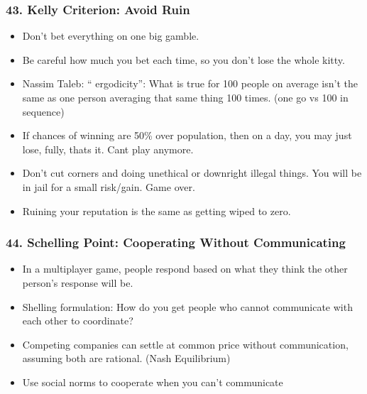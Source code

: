 \begin{frame}[fragile]
\frametitle{43. Kelly Criterion: Avoid Ruin}
\begin{itemize}
\item Don’t bet everything on one big gamble. 
\item Be careful how much you bet each time, so you don’t lose the whole kitty.
\item Nassim Taleb: `` ergodicity'': What is true for 100 people on average isn’t the same as one person averaging that same thing 100 times. (one go vs 100 in sequence)
\item If chances of winning are 50\% over population, then on a day, you may just lose, fully, thats it. Cant play anymore.
\item Don't cut corners and doing unethical or downright illegal things. You will be in jail for a small risk/gain. Game over.
\item Ruining your reputation is the same as getting wiped to zero.
\end{itemize}
\end{frame}

\begin{frame}[fragile]
\frametitle{44. Schelling Point: Cooperating Without Communicating}
\begin{itemize}
\item In a multiplayer game, people respond based on what they think the other person’s response will be.
\item Shelling formulation:  How do you get people who cannot communicate with each other to coordinate?
\item Competing companies can settle at common price without communication, assuming both are rational. (Nash Equilibrium)
\item Use social norms to cooperate when you can’t communicate
\end{itemize}
\end{frame}

